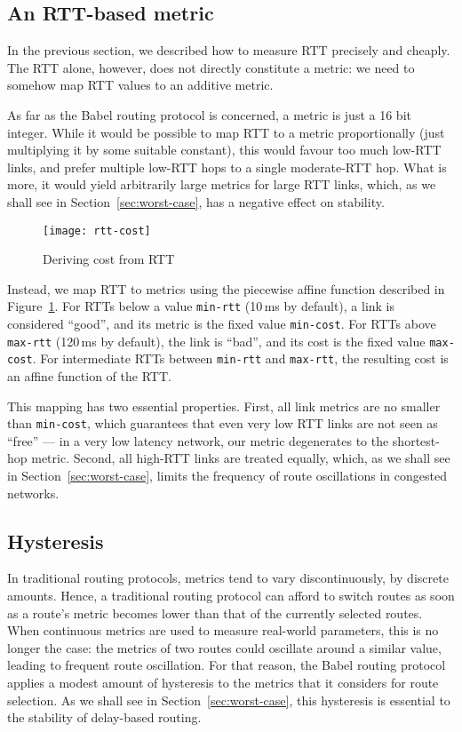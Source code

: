 \documentclass[conference,letterpaper]{IEEEtran}
\begin{document}
\subsection{An RTT-based metric}

In the previous section, we described how to measure RTT precisely and
cheaply.  The RTT alone, however, does not directly constitute
a metric: we need to somehow map RTT values to an additive metric.

As far as the Babel routing protocol is concerned, a metric is just
a 16 bit integer.  While it would be possible to map RTT to a metric
proportionally (just multiplying it by some suitable constant), this
would favour too much low-RTT links, and prefer multiple low-RTT hops
to a single moderate-RTT hop.  What is more, it would yield
arbitrarily large metrics for large RTT links, which, as we shall see
in Section~\ref{sec:worst-case}, has a negative effect on stability.

\begin{figure}[htb]
\centering
\texttt{[image: rtt-cost]}
\caption{Deriving cost from RTT}\label{fig:rtt-cost}
\end{figure}

Instead, we map RTT to metrics using the piecewise affine function
described in Figure~\ref{fig:rtt-cost}.  For RTTs below a value
\texttt{min-rtt} (10\,ms by default), a link is considered ``good'',
and its metric is the fixed value \texttt{min-cost}.  For RTTs above
\texttt{max-rtt} (120\,ms by default), the link is ``bad'', and its
cost is the fixed value \texttt{max-cost}.  For intermediate RTTs
between \texttt{min-rtt} and \texttt{max-rtt}, the resulting cost is
an affine function of the RTT.

This mapping has two essential properties.  First, all link metrics
are no smaller than \texttt{min-cost}, which guarantees that even very
low RTT links are not seen as ``free'' --- in a very low latency
network, our metric degenerates to the shortest-hop metric.  Second,
all high-RTT links are treated equally, which, as we shall see in
Section~\ref{sec:worst-case}, limits the frequency of route
oscillations in congested networks.

\subsection{Hysteresis}

In traditional routing protocols, metrics tend to vary
discontinuously, by discrete amounts.  Hence, a traditional routing
protocol can afford to switch routes as soon as a route's metric
becomes lower than that of the currently selected routes.  When
continuous metrics are used to measure real-world parameters, this is
no longer the case: the metrics of two routes could oscillate around
a similar value, leading to frequent route oscillation.  For that
reason, the Babel routing protocol applies a modest amount of
hysteresis to the metrics that it considers for route selection.  As
we shall see in Section~\ref{sec:worst-case}, this hysteresis is
essential to the stability of delay-based routing.
\end{document}
